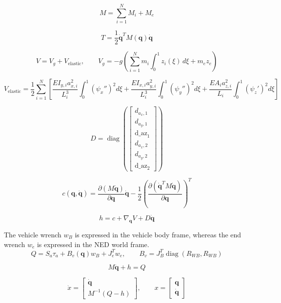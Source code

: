 \documentclass[11pt]{article}
\begin{document}
\begin{equation}
M=\sum_{i=1}^{N}M_i+M_e\label{eq:mass-assembly}
\end{equation}

\begin{equation}
T=\frac12\dot{\boldsymbol q}^{T}M(\boldsymbol q)\dot{\boldsymbol q}
\end{equation}

\begin{equation}
V=V_g+V_{\mathrm{elastic}},\qquad V_g=-g\!\left(\sum_{i=1}^{N}m_i\int_0^1z_i(\xi)\,d\xi+m_ez_e\right)
\end{equation}

\begin{equation}
V_{\mathrm{elastic}}=\frac12\sum_{i=1}^{N}\left[\frac{EI_{y,i}a_{x,i}^{2}}{L_i^3}\int_0^1(\psi_x'')^2d\xi+\frac{EI_{x,i}a_{y,i}^{2}}{L_i^3}\int_0^1(\psi_y'')^2d\xi+\frac{EA_i a_{z,i}^{2}}{L_i}\int_0^1(\psi_z')^2d\xi\right]
\end{equation}

\begin{equation}
D=\operatorname{diag}\!\left(\begin{bmatrix}d_{a_x,1}\\d_{a_y,1}\\\mathrm{d\_az}_{1}\\d_{a_x,2}\\d_{a_y,2}\\\mathrm{d\_az}_{2}\end{bmatrix}\right)
\end{equation}

\begin{equation}
c(\boldsymbol q,\dot{\boldsymbol q})=\frac{\partial(M\dot{\boldsymbol q})}{\partial\boldsymbol q}\dot{\boldsymbol q}-\frac12\left(\frac{\partial(\dot{\boldsymbol q}^{T}M\dot{\boldsymbol q})}{\partial\boldsymbol q}\right)^T
\end{equation}

\begin{equation}
h=c+\nabla_{\boldsymbol q}V+D\dot{\boldsymbol q}
\end{equation}

The vehicle wrench $w_B$ is expressed in the vehicle body frame, whereas the end wrench $w_e$ is expressed in the NED world frame.
\begin{equation}
Q=S_a\tau_a+B_v(\boldsymbol q)w_B+J_e^Tw_e,\qquad B_v=J_B^T\operatorname{diag}(R_{WB},R_{WB})
\end{equation}

\begin{equation}
M\ddot{\boldsymbol q}+h=Q\label{eq:dynamics}
\end{equation}

\begin{equation}
\dot x=\begin{bmatrix}\dot{\boldsymbol q}\\M^{-1}(Q-h)\end{bmatrix},\qquad x=\begin{bmatrix}\boldsymbol q\\\dot{\boldsymbol q}\end{bmatrix}
\end{equation}
\end{document}
